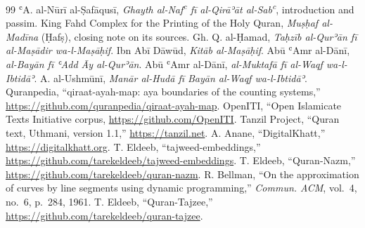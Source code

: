 \documentclass[conference]{IEEEtran}
\begin{document}
\begin{thebibliography}{99}
 ʿA. al-Nūrī al-Ṣafāqusī, \emph{Ghayth al-Naf\textsuperscript{c} fī al-Qirāʾāt al-Sab\textsuperscript{c}}, introduction and passim.
 King Fahd Complex for the Printing of the Holy Quran, \emph{Muṣḥaf al-Madīna} (Ḥafṣ), closing note on its sources.
 Gh. Q. al-Ḥamad, \emph{Taḥzīb al-Qurʾān fī al-Maṣādir wa-l-Maṣāḥif}.
 Ibn Abī Dāwūd, \emph{Kitāb al-Maṣāḥif}.
 Abū ʿAmr al-Dānī, \emph{al-Bayān fī ʿAdd Āy al-Qurʾān}.
 Abū ʿAmr al-Dānī, \emph{al-Muktafā fī al-Waqf wa-l-Ibtidāʾ}.
 A. al-Ushmūnī, \emph{Manār al-Hudā fī Bayān al-Waqf wa-l-Ibtidāʾ}.
 Quranpedia, ``qiraat-ayah-map: aya boundaries of the counting systems,'' \url{https://github.com/quranpedia/qiraat-ayah-map}.
 OpenITI, ``Open Islamicate Texts Initiative corpus, \url{https://github.com/OpenITI}.
 Tanzil Project, ``Quran text, Uthmani, version 1.1,'' \url{https://tanzil.net}.
 A. Anane, ``DigitalKhatt,'' \url{https://digitalkhatt.org}.
 T. Eldeeb, ``tajweed-embeddings,'' \url{https://github.com/tarekeldeeb/tajweed-embeddings}.
 T. Eldeeb, ``Quran-Nazm,'' \url{https://github.com/tarekeldeeb/quran-nazm}.
 R. Bellman, ``On the approximation of curves by line segments using dynamic programming,'' \emph{Commun. ACM}, vol.~4, no.~6, p.~284, 1961.
 T. Eldeeb, ``Quran-Tajzee,'' \url{https://github.com/tarekeldeeb/quran-tajzee}.
\end{thebibliography}
\end{document}
